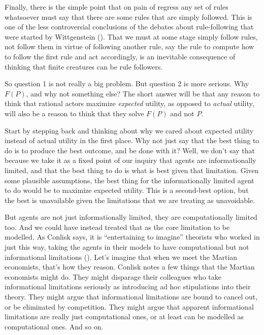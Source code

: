 \documentclass[
  11pt,
  letterpaper,
  DIV=11,
  numbers=noendperiod,
  oneside]{scrartcl}
\begin{document}
Finally, there is the simple point that on pain of regress any set of
rules whatsoever must say that there are some rules that are simply
followed. This is one of the less controversial conclusions of the
debates about rule-following that were started by Wittgenstein
(). That we must at some stage
simply follow rules, not follow them in virtue of following another
rule, say the rule to compute how to follow the first rule and act
accordingly, is an inevitable consequence of thinking that finite
creatures can be rule followers.

So question 1 is not really a big problem. But question 2 is more
serious. Why \(F(P)\), and why not something else? The short answer will
be that any reason to think that rational actors maximize
\emph{expected} utility, as opposed to \emph{actual} utility, will also
be a reason to think that they solve \(F(P)\) and not \(P\).

Start by stepping back and thinking about why we cared about expected
utility instead of actual utility in the first place. Why not just say
that the best thing to do is to produce the best outcome, and be done
with it? Well, we don't say that because we take it as a fixed point of
our inquiry that agents are informationally limited, and that the best
thing to do is what is best given that limitation. Given some plausible
assumptions, the best thing for the informationally limited agent to do
would be to maximize expected utility. This is a second-best option, but
the best is unavailable given the limitations that we are treating as
unavoidable.

But agents are not just informationally limited, they are
computationally limited too. And we could have instead treated that as
the core limitation to be modelled. As Conlisk says, it is
``entertaining to imagine'' theorists who worked in just this way,
taking the agents in their models to have computational but not
informational limitations (). Let's imagine that when we meet the Martian economists, that's
how they reason. Conlisk notes a few things that the Martian economists
might do. They might disparage their colleagues who take informational
limitations seriously as introducing ad hoc stipulations into their
theory. They might argue that informational limitations are bound to
cancel out, or be eliminated by competition. They might argue that
apparent informational limitations are really just computational ones,
or at least can be modelled as computational ones. And so on.
\end{document}
